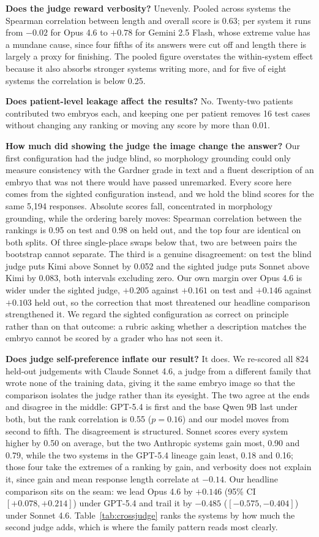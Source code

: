\textbf{Does the judge reward verbosity?} Unevenly. Pooled across systems the
Spearman correlation between length and overall score is 0.63; per system it runs
from $-0.02$ for Opus 4.6 to $+0.78$ for Gemini 2.5 Flash, whose extreme value
has a mundane cause, since four fifths of its answers were cut off and length
there is largely a proxy for finishing. The pooled figure overstates the
within-system effect because it also absorbs stronger systems writing more, and
for five of eight systems the correlation is below 0.25.

\textbf{Does patient-level leakage affect the results?} No. Twenty-two patients
contributed two embryos each, and keeping one per patient removes 16 test cases
without changing any ranking or moving any score by more than 0.01.

\textbf{How much did showing the judge the image change the answer?} Our first
configuration had the judge blind, so morphology grounding could only measure
consistency with the Gardner grade in text and a fluent description of an embryo
that was not there would have passed unremarked. Every score here comes from the
sighted configuration instead, and we hold the blind scores for the same 5,194
responses. Absolute scores fall, concentrated in morphology grounding, while the
ordering barely moves: Spearman correlation between the rankings is 0.95 on test
and 0.98 on held out, and the top four are identical on both splits. Of three
single-place swaps below that, two are between pairs the bootstrap cannot
separate. The third is a genuine disagreement: on test the blind judge puts Kimi
above Sonnet by 0.052 and the sighted judge puts Sonnet above Kimi by 0.083, both
intervals excluding zero. Our own margin over Opus 4.6 is wider under the sighted
judge, $+0.205$ against $+0.161$ on test and $+0.146$ against $+0.103$ held out,
so the correction that most threatened our headline comparison strengthened it.
We regard the sighted configuration as correct on principle rather than on that
outcome: a rubric asking whether a description matches the embryo cannot be
scored by a grader who has not seen it.

\textbf{Does judge self-preference inflate our result?} It does. We re-scored all
824 held-out judgements with Claude Sonnet 4.6, a judge from a different family
that wrote none of the training data, giving it the same embryo image so that the
comparison isolates the judge rather than its eyesight. The two agree at the ends
and disagree in the middle: GPT-5.4 is first and the base Qwen 9B last under
both, but the rank correlation is 0.55 ($p{=}0.16$) and our model moves from
second to fifth. The disagreement is structured. Sonnet scores every system
higher by 0.50 on average, but the two Anthropic systems gain most, 0.90 and
0.79, while the two systems in the GPT-5.4 lineage gain least, 0.18 and 0.16;
those four take the extremes of a ranking by gain, and verbosity does not explain
it, since gain and mean response length correlate at $-0.14$. Our headline
comparison sits on the seam: we lead Opus 4.6 by $+0.146$ (95\% CI $[+0.078,
+0.214]$) under GPT-5.4 and trail it by $-0.485$ ($[-0.575, -0.404]$) under
Sonnet 4.6. Table~\ref{tab:crossjudge} ranks the systems by how much the second
judge adds, which is where the family pattern reads most clearly.

